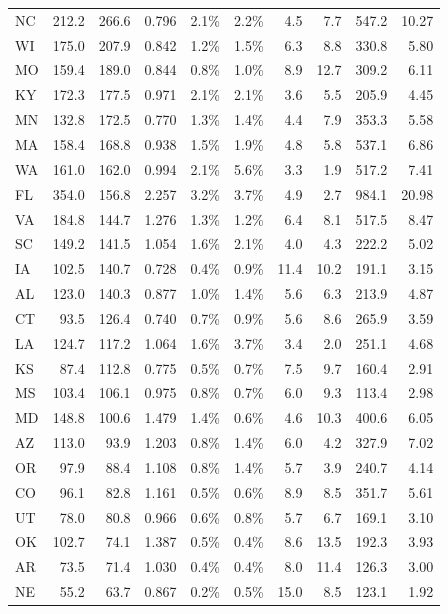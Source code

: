 \begin{footnotesize}
\begin{singlespace}
\begin{longtable}{l r r r r r r r r r}
NC & 212.2 & 266.6 & 0.796 & 2.1\% & 2.2\% & 4.5 & 7.7 & 547.2 & 10.27 \\
WI & 175.0 & 207.9 & 0.842 & 1.2\% & 1.5\% & 6.3 & 8.8 & 330.8 & 5.80 \\
MO & 159.4 & 189.0 & 0.844 & 0.8\% & 1.0\% & 8.9 & 12.7 & 309.2 & 6.11 \\
KY & 172.3 & 177.5 & 0.971 & 2.1\% & 2.1\% & 3.6 & 5.5 & 205.9 & 4.45 \\
MN & 132.8 & 172.5 & 0.770 & 1.3\% & 1.4\% & 4.4 & 7.9 & 353.3 & 5.58 \\
MA & 158.4 & 168.8 & 0.938 & 1.5\% & 1.9\% & 4.8 & 5.8 & 537.1 & 6.86 \\
WA & 161.0 & 162.0 & 0.994 & 2.1\% & 5.6\% & 3.3 & 1.9 & 517.2 & 7.41 \\
FL & 354.0 & 156.8 & 2.257 & 3.2\% & 3.7\% & 4.9 & 2.7 & 984.1 & 20.98 \\
VA & 184.8 & 144.7 & 1.276 & 1.3\% & 1.2\% & 6.4 & 8.1 & 517.5 & 8.47 \\
SC & 149.2 & 141.5 & 1.054 & 1.6\% & 2.1\% & 4.0 & 4.3 & 222.2 & 5.02 \\
IA & 102.5 & 140.7 & 0.728 & 0.4\% & 0.9\% & 11.4 & 10.2 & 191.1 & 3.15 \\
AL & 123.0 & 140.3 & 0.877 & 1.0\% & 1.4\% & 5.6 & 6.3 & 213.9 & 4.87 \\
CT & 93.5 & 126.4 & 0.740 & 0.7\% & 0.9\% & 5.6 & 8.6 & 265.9 & 3.59 \\
LA & 124.7 & 117.2 & 1.064 & 1.6\% & 3.7\% & 3.4 & 2.0 & 251.1 & 4.68 \\
KS & 87.4 & 112.8 & 0.775 & 0.5\% & 0.7\% & 7.5 & 9.7 & 160.4 & 2.91 \\
MS & 103.4 & 106.1 & 0.975 & 0.8\% & 0.7\% & 6.0 & 9.3 & 113.4 & 2.98 \\
MD & 148.8 & 100.6 & 1.479 & 1.4\% & 0.6\% & 4.6 & 10.3 & 400.6 & 6.05 \\
AZ & 113.0 & 93.9 & 1.203 & 0.8\% & 1.4\% & 6.0 & 4.2 & 327.9 & 7.02 \\
OR & 97.9 & 88.4 & 1.108 & 0.8\% & 1.4\% & 5.7 & 3.9 & 240.7 & 4.14 \\
CO & 96.1 & 82.8 & 1.161 & 0.5\% & 0.6\% & 8.9 & 8.5 & 351.7 & 5.61 \\
UT & 78.0 & 80.8 & 0.966 & 0.6\% & 0.8\% & 5.7 & 6.7 & 169.1 & 3.10 \\
OK & 102.7 & 74.1 & 1.387 & 0.5\% & 0.4\% & 8.6 & 13.5 & 192.3 & 3.93 \\
AR & 73.5 & 71.4 & 1.030 & 0.4\% & 0.4\% & 8.0 & 11.4 & 126.3 & 3.00 \\
NE & 55.2 & 63.7 & 0.867 & 0.2\% & 0.5\% & 15.0 & 8.5 & 123.1 & 1.92 \\

\end{longtable}
\end{singlespace}
\end{footnotesize}
